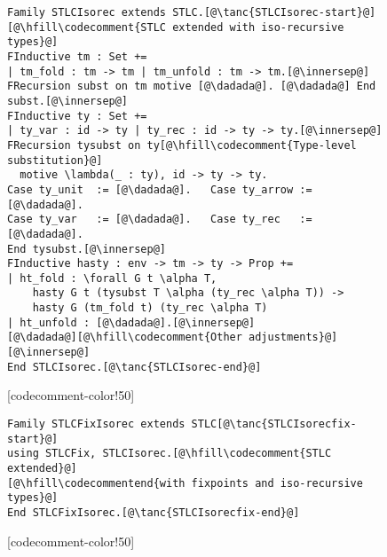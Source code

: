 \begin{figure}

\newcommand{\innersep}{\vspace{5pt}}

\begin{minipage}{\textwidth}
\begin{multicols}{2}


\begin{lstlisting}
Family STLCIsorec extends STLC.[@\tanc{STLCIsorec-start}@]
[@\hfill\codecomment{STLC extended with iso-recursive types}@]
FInductive tm : Set +=
| tm_fold : tm -> tm | tm_unfold : tm -> tm.[@\innersep@]
FRecursion subst on tm motive [@\dadada@]. [@\dadada@] End subst.[@\innersep@]
FInductive ty : Set +=
| ty_var : id -> ty | ty_rec : id -> ty -> ty.[@\innersep@]
FRecursion tysubst on ty[@\hfill\codecomment{Type-level substitution}@]
  motive \lambda(_ : ty), id -> ty -> ty.
Case ty_unit  := [@\dadada@].   Case ty_arrow := [@\dadada@].
Case ty_var   := [@\dadada@].   Case ty_rec   := [@\dadada@].
End tysubst.[@\innersep@]
FInductive hasty : env -> tm -> ty -> Prop +=
| ht_fold : \forall G t \alpha T,
    hasty G t (tysubst T \alpha (ty_rec \alpha T)) ->
    hasty G (tm_fold t) (ty_rec \alpha T)
| ht_unfold : [@\dadada@].[@\innersep@]
[@\dadada@][@\hfill\codecomment{Other adjustments}@][@\innersep@]
End STLCIsorec.[@\tanc{STLCIsorec-end}@]
\end{lstlisting}

[codecomment-color!50]

\vspace{-12pt}


\begin{lstlisting}
Family STLCFixIsorec extends STLC[@\tanc{STLCIsorecfix-start}@]
using STLCFix, STLCIsorec.[@\hfill\codecomment{STLC extended}@]
[@\hfill\codecommentend{with fixpoints and iso-recursive types}@]
End STLCFixIsorec.[@\tanc{STLCIsorecfix-end}@]
\end{lstlisting}

[codecomment-color!50]

\columnbreak



\end{multicols}
\end{minipage}
\end{figure}
